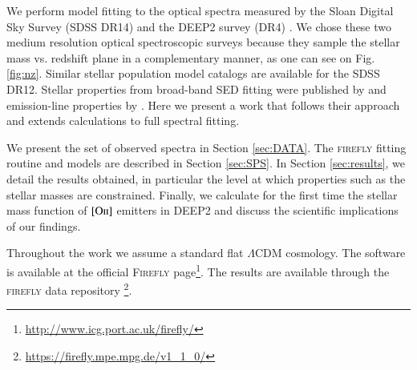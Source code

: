 \documentclass[onecolumn]{aa}
\newcommand{\OII}{$\left[\mathrm{O\textrm{\textsc{ii}}}\right]$\xspace}
\begin{document}
We perform model fitting to the optical spectra measured by the Sloan Digital Sky Survey (SDSS DR14) and the DEEP2 survey (DR4) \citep{SDSS_DR14,Newman_2013}. 
We chose these two medium resolution optical spectroscopic surveys because they sample the stellar mass vs. redshift plane in a complementary manner, as one can see on Fig. \ref{fig:nz}. 
Similar stellar population model catalogs are available for the SDSS DR12. Stellar properties from broad-band SED fitting were published by \citet{Maraston2013} and emission-line properties by \citet{Thomas2013a}. Here we present a work that follows their approach and extends calculations to full spectral fitting. 

We present the set of observed spectra in Section \ref{sec:DATA}. 
The \textsc{firefly} fitting routine and models are described in Section \ref{sec:SPS}. 
In Section \ref{sec:results}, we detail the results obtained, in particular the level at which properties such as the stellar masses are constrained. 
Finally, 
 we calculate for the first time the stellar mass function of \OII emitters in DEEP2 and discuss the scientific implications of our findings.

Throughout the work we assume a standard flat $\Lambda$CDM \citep{Planck_2014} cosmology. 
The software is available at the official \textsc{Firefly} page\footnote{\url{http://www.icg.port.ac.uk/firefly/}}.
The results are available through the \textsc{firefly} data repository
\footnote{\url{https://firefly.mpe.mpg.de/v1_1_0/}}.
\end{document}
